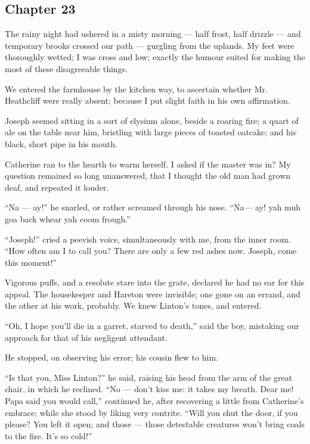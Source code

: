 \subsection*{Chapter 23}

\par The rainy night had ushered in a misty morning — half frost, half drizzle — and temporary brooks crossed our path — gurgling from the uplands. My feet were thoroughly wetted; I was cross and low; exactly the humour suited for making the most of these disagreeable things.
\par We entered the farmhouse by the kitchen way, to ascertain whether Mr. Heathcliff were really absent; because I put slight faith in his own affirmation.
\par Joseph seemed sitting in a sort of elysium alone, beside a roaring fire; a quart of ale on the table near him, bristling with large pieces of toasted oatcake; and his black, short pipe in his mouth.
\par Catherine ran to the hearth to warm herself. I asked if the master was in? My question remained so long unanswered, that I thought the old man had grown deaf, and repeated it louder.
\par “Na — ay!” he snarled, or rather screamed through his nose. “Na— ay! yah muh goa back whear yah coom frough.”
\par “Joseph!” cried a peevish voice, simultaneously with me, from the inner room. “How often am I to call you? There are only a few red ashes now. Joseph, come this moment!”
\par Vigorous puffs, and a resolute stare into the grate, declared he had no ear for this appeal. The housekeeper and Hareton were invisible; one gone on an errand, and the other at his work, probably. We knew Linton's tones, and entered.
\par “Oh, I hope you'll die in a garret, starved to death,” said the boy, mistaking our approach for that of his negligent attendant.
\par He stopped, on observing his error; his cousin flew to him.
\par “Is that you, Miss Linton?” he said, raising his head from the arm of the great chair, in which he reclined. “No — don't kiss me: it takes my breath. Dear me! Papa said you would call,” continued he, after recovering a little from Catherine's embrace; while she stood by liking very contrite. “Will you shut the door, if you please? You left it open; and those — those detestable creatures won't bring coals to the fire. It's so cold!”
